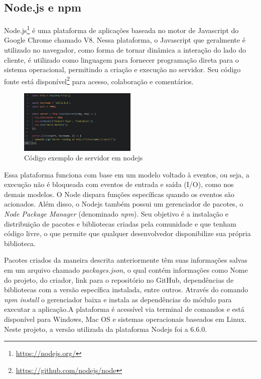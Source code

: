 \subsection{Node.js e npm}\label{sec:node-js}

Node.js\footnote{\url{https://nodejs.org/}} é uma plataforma de aplicações baseada no motor de Javascript do Google Chrome chamado V8\cite{nodejs}. Nessa plataforma, o Javascript que geralmente é utilizado no navegador, como forma de tornar dinâmica a interação do lado do cliente, é utilizado como linguagem para fornecer programação direta para o sistema operacional, permitindo a criação e execução no servidor. Seu código fonte está disponível\footnote{\url{https://github.com/nodejs/node}} para acesso, colaboração e comentários.
\begin{figure}[htb]
	\caption{\label{fig:codejs}Código exemplo de servidor em nodejs}
	\begin{center}
		\includegraphics[width=0.50\textwidth]{img/codejs.png}
	\end{center}
\end{figure}
Essa plataforma funciona com base em um modelo voltado à eventos, ou seja, a execução não é bloqueada com eventos de entrada e saída (I/O), como nos demais modelos. O Node dispara funções específicas quando os eventos são acionados. Além disso, o Nodejs também possui um gerenciador de pacotes, o \textit{Node Package Manager} (denominado \textit{npm}). Seu objetivo é a instalação e distribuição de pacotes e bibliotecas criadas pela comunidade e que tenham código livre, o que permite que qualquer desenvolvedor disponibilize sua própria biblioteca.

Pacotes criados da maneira descrita anteriormente têm suas informações salvas em um arquivo chamado \textit{packages.json}, o qual contém informações como Nome do projeto, do criador, link para o repositório no GitHub, dependências de bibliotecas com a versão específica instalada, entre outros. Através do comando \textit{npm install} o gerenciador baixa e instala as dependências do módulo para executar a aplicação.A plataforma é acessível via terminal de comandos e está disponível para Windows, Mac OS e sistemas operacionais baseados em Linux. Neste projeto, a versão utilizada da plataforma Nodejs foi a 6.6.0. 




